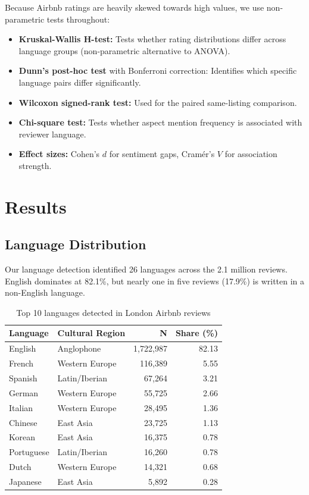 \documentclass[12pt,a4paper]{article}
\begin{document}
Because Airbnb ratings are heavily skewed towards high values, we use non-parametric tests throughout:

\begin{itemize}[nosep]
    \item \textbf{Kruskal-Wallis H-test:} Tests whether rating distributions differ across language groups (non-parametric alternative to ANOVA).
    \item \textbf{Dunn's post-hoc test} with Bonferroni correction: Identifies which specific language pairs differ significantly.
    \item \textbf{Wilcoxon signed-rank test:} Used for the paired same-listing comparison.
    \item \textbf{Chi-square test:} Tests whether aspect mention frequency is associated with reviewer language.
    \item \textbf{Effect sizes:} Cohen's $d$ for sentiment gaps, Cram\'{e}r's $V$ for association strength.
\end{itemize}

\section{Results}

\subsection{Language Distribution}

Our language detection identified 26 languages across the 2.1 million reviews.
English dominates at 82.1\%, but nearly one in five reviews (17.9\%) is written in a non-English language.

\begin{table}[H]
\centering
\caption{Top 10 languages detected in London Airbnb reviews}
\begin{tabular}{llrr}
\toprule
\textbf{Language} & \textbf{Cultural Region} & \textbf{N} & \textbf{Share (\%)} \\
\midrule
English    & Anglophone      & 1,722,987 & 82.13 \\
French     & Western Europe  & 116,389   & 5.55 \\
Spanish    & Latin/Iberian   & 67,264    & 3.21 \\
German     & Western Europe  & 55,725    & 2.66 \\
Italian    & Western Europe  & 28,495    & 1.36 \\
Chinese    & East Asia       & 23,725    & 1.13 \\
Korean     & East Asia       & 16,375    & 0.78 \\
Portuguese & Latin/Iberian   & 16,260    & 0.78 \\
Dutch      & Western Europe  & 14,321    & 0.68 \\
Japanese   & East Asia       & 5,892     & 0.28 \\
\bottomrule
\end{tabular}
\end{table}
\end{document}
